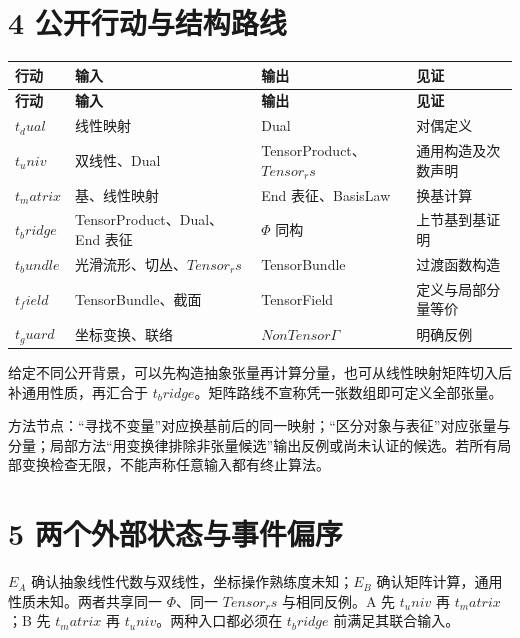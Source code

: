 \documentclass[UTF8,a4paper,zihao=-4,fontset=windows,openany]{ctexbook}
\def\mathrm#1{#1}%
\begin{document}
\section{4 公开行动与结构路线}
\begingroup\small\setlength{\tabcolsep}{4pt}
\begin{longtable}{>{\raggedright\arraybackslash}p{}>{\raggedright\arraybackslash}p{}>{\raggedright\arraybackslash}p{}>{\raggedright\arraybackslash}p{}}
\toprule
\textbf{行动} & \textbf{输入} & \textbf{输出} & \textbf{见证} \\
\midrule
\endfirsthead
\toprule
\textbf{行动} & \textbf{输入} & \textbf{输出} & \textbf{见证} \\
\midrule
\endhead
\bottomrule
\endfoot
\bottomrule
\endlastfoot
\(t_\mathrm{dual}\) & 线性映射 & Dual & 对偶定义 \\
\(t_\mathrm{univ}\) & 双线性、Dual & TensorProduct、\(\mathrm{Tensor}_\mathrm{rs}\) & 通用构造及次数声明 \\
\(t_\mathrm{matrix}\) & 基、线性映射 & End 表征、BasisLaw & 换基计算 \\
\(t_\mathrm{bridge}\) & TensorProduct、Dual、End 表征 & \(\Phi\) 同构 & 上节基到基证明 \\
\(t_\mathrm{bundle}\) & 光滑流形、切丛、\(\mathrm{Tensor}_\mathrm{rs}\) & TensorBundle & 过渡函数构造 \\
\(t_\mathrm{field}\) & TensorBundle、截面 & TensorField & 定义与局部分量等价 \\
\(t_\mathrm{guard}\) & 坐标变换、联络 & \(\mathrm{NonTensor}\Gamma\) & 明确反例 \\
\end{longtable}
\endgroup

给定不同公开背景，可以先构造抽象张量再计算分量，也可从线性映射矩阵切入后补通用性质，再汇合于 \(t_\mathrm{bridge}\)。矩阵路线不宣称凭一张数组即可定义全部张量。

方法节点：“寻找不变量”对应换基前后的同一映射；“区分对象与表征”对应张量与分量；局部方法“用变换律排除非张量候选”输出反例或尚未认证的候选。若所有局部变换检查无限，不能声称任意输入都有终止算法。

\section{5 两个外部状态与事件偏序}
\(E_A\) 确认抽象线性代数与双线性，坐标操作熟练度未知；\(E_B\) 确认矩阵计算，通用性质未知。两者共享同一 \(\Phi\)、同一 \(\mathrm{Tensor}_\mathrm{rs}\) 与相同反例。A 先 \(t_\mathrm{univ}\) 再 \(t_\mathrm{matrix}\)；B 先 \(t_\mathrm{matrix}\) 再 \(t_\mathrm{univ}\)。两种入口都必须在 \(t_\mathrm{bridge}\) 前满足其联合输入。
\end{document}
